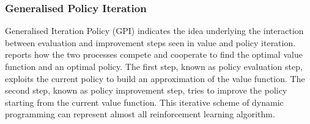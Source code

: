 \subsubsection{Generalised Policy Iteration}

Generalised Iteration Policy (GPI) indicates the idea underlying the interaction between evaluation and improvement steps seen in value and policy iteration.
 reports how the two processes compete and cooperate to find the optimal value function and an optimal policy. The first step, known as policy evaluation step, exploits the current policy to build an approximation of the value function. The second step, known as policy improvement step, tries to improve the policy starting from the current value function.
This iterative scheme of dynamic programming can represent almost all reinforcement learning algorithm.

